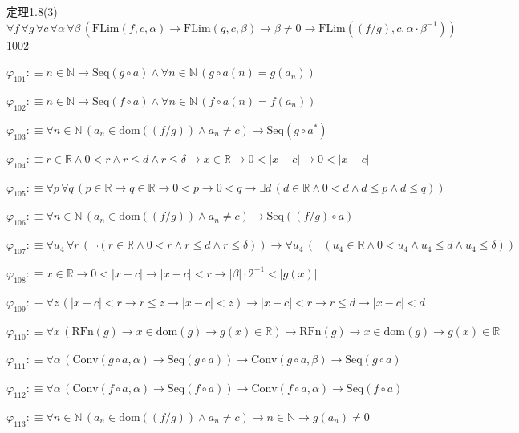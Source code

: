 \begin{fullproof}{定理1.8(3)}{$\forall f\,\forall g\,\forall c\,\forall \alpha\,\forall \beta\,(\mathrm{FLim}(f,c,\alpha) \to \mathrm{FLim}(g,c,\beta) \to \beta \neq 0 \to \mathrm{FLim}((f / g),c,\alpha \cdot \beta^{-1}))$}{1002}
\begin{abbrevlist}
\item $\varphi_{101} :\equiv n \in \mathbb{N} \to \mathrm{Seq}(g \circ a) \land \forall n \in \mathbb{N}\,(g \circ a(n) = g(a_{n}))$
\item $\varphi_{102} :\equiv n \in \mathbb{N} \to \mathrm{Seq}(f \circ a) \land \forall n \in \mathbb{N}\,(f \circ a(n) = f(a_{n}))$
\item $\varphi_{103} :\equiv \forall n \in \mathbb{N}\,(a_{n} \in \mathrm{dom}((f / g)) \land a_{n} \neq c) \to \mathrm{Seq}(g \circ a^{\ast})$
\item $\varphi_{104} :\equiv r \in \mathbb{R} \land 0 < r \land r \leq d \land r \leq \delta \to x \in \mathbb{R} \to 0 < \lvert x - c \rvert \to 0 < \lvert x - c \rvert$
\item $\varphi_{105} :\equiv \forall p\,\forall q\,(p \in \mathbb{R} \to q \in \mathbb{R} \to 0 < p \to 0 < q \to \exists d\,(d \in \mathbb{R} \land 0 < d \land d \leq p \land d \leq q))$
\item $\varphi_{106} :\equiv \forall n \in \mathbb{N}\,(a_{n} \in \mathrm{dom}((f / g)) \land a_{n} \neq c) \to \mathrm{Seq}((f / g) \circ a)$
\item $\varphi_{107} :\equiv \forall u_{4}\,\forall r\,(\neg (r \in \mathbb{R} \land 0 < r \land r \leq d \land r \leq \delta)) \to \forall u_{4}\,(\neg (u_{4} \in \mathbb{R} \land 0 < u_{4} \land u_{4} \leq d \land u_{4} \leq \delta))$
\item $\varphi_{108} :\equiv x \in \mathbb{R} \to 0 < \lvert x - c \rvert \to \lvert x - c \rvert < r \to \lvert \beta \rvert \cdot 2^{-1} < \lvert g(x) \rvert$
\item $\varphi_{109} :\equiv \forall z\,(\lvert x - c \rvert < r \to r \leq z \to \lvert x - c \rvert < z) \to \lvert x - c \rvert < r \to r \leq d \to \lvert x - c \rvert < d$
\item $\varphi_{110} :\equiv \forall x\,(\mathrm{RFn}(g) \to x \in \mathrm{dom}(g) \to g(x) \in \mathbb{R}) \to \mathrm{RFn}(g) \to x \in \mathrm{dom}(g) \to g(x) \in \mathbb{R}$
\item $\varphi_{111} :\equiv \forall \alpha\,(\mathrm{Conv}(g \circ a,\alpha) \to \mathrm{Seq}(g \circ a)) \to \mathrm{Conv}(g \circ a,\beta) \to \mathrm{Seq}(g \circ a)$
\item $\varphi_{112} :\equiv \forall \alpha\,(\mathrm{Conv}(f \circ a,\alpha) \to \mathrm{Seq}(f \circ a)) \to \mathrm{Conv}(f \circ a,\alpha) \to \mathrm{Seq}(f \circ a)$
\item $\varphi_{113} :\equiv \forall n \in \mathbb{N}\,(a_{n} \in \mathrm{dom}((f / g)) \land a_{n} \neq c) \to n \in \mathbb{N} \to g(a_{n}) \neq 0$

\end{abbrevlist}
\end{fullproof}
